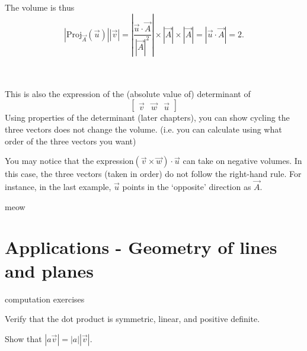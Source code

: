 The volume is thus \[
	|\textrm{Proj}_{\vec{A}}(\vec{u})||\vec{v}|=|\frac{\vec{u}\cdot\vec{A}}{|\vec{A}|^2}|\times |\vec{A}| \times|\vec{A}| = |\vec{u}\cdot\vec{A}| = 2.
\]\ \\

\ \\

\begin{remark}
	This is also the expression of the (absolute value of) determinant of \[
	\begin{bmatrix}
		\vec{v}&\vec{w}&\vec{u}
	\end{bmatrix}
	\]
	Using properties of the determinant (later chapters), you can show cycling the three vectors does not change the volume. (i.e. you can calculate using what order of the three vectors you want)
\end{remark}
	
\begin{remark}
	You may notice that the expression$(\vec{v}\times\vec{w})\cdot{\vec{u}}$ can take on negative volumes. In this case, the three vectors (taken in order) do not follow the right-hand rule. For instance, in the last example, $\vec{u}$ points in the `opposite' direction as $\vec{A}$.
\end{remark}
\exercises
\begin{exerciselist}
	\item meow
\end{exerciselist}
\section{Applications - Geometry of lines and planes}
\exercises
\begin{exerciselist}
	\item computation exercises
	\item Verify that the dot product is symmetric, linear, and positive definite.
	\item Show that $|a\vec{v}| = |a||\vec{v}|$.
\end{exerciselist}
	
	

